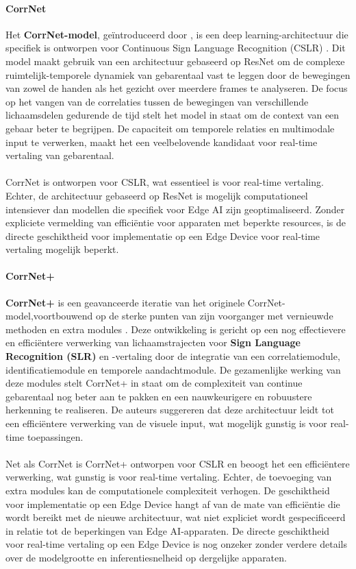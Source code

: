 \paragraph{CorrNet}
Het \textbf{CorrNet-model}, geïntroduceerd door \textcite{hu2023continuoussignlanguagerecognition}, is een deep learning-architectuur die specifiek is ontworpen voor Continuous Sign Language Recognition (CSLR) \citep{hu2023continuoussignlanguagerecognition}. Dit model maakt gebruik van een architectuur gebaseerd op ResNet om de complexe ruimtelijk-temporele dynamiek van gebarentaal vast te leggen door de bewegingen van zowel de handen als het gezicht over meerdere frames te analyseren. De focus op het vangen van de correlaties tussen de bewegingen van verschillende lichaamsdelen gedurende de tijd stelt het model in staat om de context van een gebaar beter te begrijpen. De capaciteit om temporele relaties en multimodale input te verwerken, maakt het een veelbelovende kandidaat voor real-time vertaling van gebarentaal.
\\
\\
CorrNet is ontworpen voor CSLR, wat essentieel is voor real-time vertaling. \nobreak Echter, de architectuur gebaseerd op ResNet is mogelijk computationeel intensiever dan modellen die specifiek voor Edge AI zijn geoptimaliseerd. Zonder expliciete vermelding van efficiëntie voor apparaten met beperkte resources, is de directe geschiktheid voor implementatie op een Edge Device voor real-time vertaling mogelijk beperkt.
\\
\paragraph{CorrNet+}
\textbf{CorrNet+} is een geavanceerde iteratie van het originele CorrNet-model,\nobreak voortbouwend op de sterke punten van zijn voorganger met vernieuwde methoden en extra modules \citep{hu2024corrnetsignlanguagerecognition}. Deze ontwikkeling is gericht op een nog effectievere en efficiëntere verwerking van lichaamstrajecten voor \textbf{Sign Language Recognition (SLR)} en -vertaling door de integratie van een correlatiemodule, identificatiemodule en temporele aandachtmodule. De gezamenlijke werking van deze modules stelt CorrNet+ in staat om de complexiteit van continue gebarentaal nog beter aan te pakken en een nauwkeurigere en robuustere herkenning te realiseren. De auteurs suggereren dat deze architectuur leidt tot een efficiëntere verwerking van de visuele input, wat mogelijk gunstig is voor real-time toepassingen.
\\
\\
Net als CorrNet is CorrNet+ ontworpen voor CSLR en beoogt het een efficiëntere verwerking, wat gunstig is voor real-time vertaling. Echter, de toevoeging van extra modules kan de computationele complexiteit verhogen. De geschiktheid voor implementatie op een Edge Device hangt af van de mate van efficiëntie die wordt bereikt met de nieuwe architectuur, wat niet expliciet wordt gespecificeerd in relatie tot de beperkingen van Edge AI-apparaten. De directe geschiktheid voor real-time vertaling op een Edge Device is nog onzeker zonder verdere details over de modelgrootte en inferentiesnelheid op dergelijke apparaten.
\\
